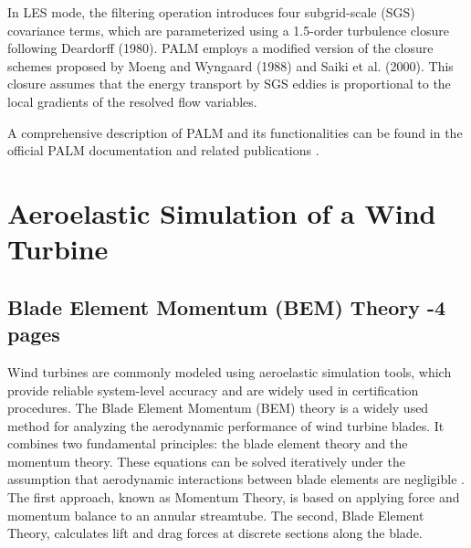 In LES mode, the filtering operation introduces four subgrid-scale (SGS) covariance terms, which are parameterized using a 1.5-order turbulence closure following Deardorff (1980). PALM employs a modified version of the closure schemes proposed by Moeng and Wyngaard (1988) and Saiki et al. (2000). This closure assumes that the energy transport by SGS eddies is proportional to the local gradients of the resolved flow variables.

A comprehensive description of PALM and its functionalities can be found in the official PALM documentation and related publications\cite{maronga2015} \cite{raasch2001}.


\section{Aeroelastic Simulation of a Wind Turbine}

\subsection{Blade Element Momentum (BEM) Theory -4 pages} 
\label{sec:bem_theory}

Wind turbines are commonly modeled using aeroelastic simulation tools, which provide reliable system-level accuracy and are widely used in certification procedures. The Blade Element Momentum (BEM) theory is a widely used method for analyzing the aerodynamic performance of wind turbine blades. It combines two fundamental principles: the blade element theory and the momentum theory. These equations can be solved iteratively under the assumption that aerodynamic interactions between blade elements are negligible \cite{ingram2011blade}. The first approach, known as Momentum Theory, is based on applying force and momentum balance to an annular streamtube. The second, Blade Element Theory, calculates lift and drag forces at discrete sections along the blade.
